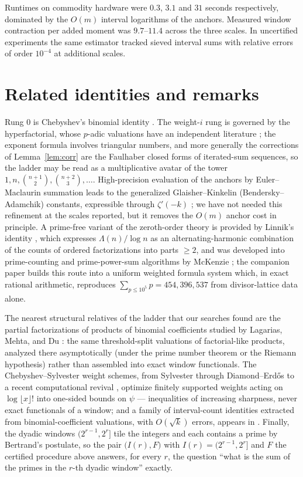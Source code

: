 \documentclass[11pt]{article}
\theoremstyle{remark}
\begin{document}
\noindent
Runtimes on commodity hardware were $0.3$, $3.1$ and $31$ seconds respectively, dominated by the
$O(m)$ interval logarithms of the anchors. Measured window contraction per added moment was $9.7$--$11.4$
across the three scales. In uncertified experiments the same estimator tracked sieved interval sums with
relative errors of order $10^{-4}$ at additional scales.

\section{Related identities and remarks}

Rung $0$ is Chebyshev's binomial identity \cite{Cheb}. The weight-$i$ rung is governed by the
hyperfactorial, whose $p$-adic valuations have an independent literature \cite{HypVal1,HypVal2}; the
exponent formula involves triangular numbers, and more generally the corrections of
Lemma~\ref{lem:corr} are the Faulhaber closed forms of iterated-sum sequences, so the ladder may be
read as a multiplicative avatar of the tower $1, n, \binom{n+1}{2}, \binom{n+2}{3}, \dots$. High-precision
evaluation of the anchors by Euler--Maclaurin summation leads to the generalized Glaisher--Kinkelin
(Bendersky--Adamchik) constants, expressible through $\zeta'(-k)$ \cite{Bend,Adam,Coppo}; we have not
needed this refinement at the scales reported, but it removes the $O(m)$ anchor cost in principle. A
prime-free variant of the zeroth-order theory is provided by Linnik's identity \cite{Linnik}, which
expresses $\Lambda(n)/\log n$ as an alternating-harmonic combination of the counts of ordered
factorizations into parts $\ge 2$, and was developed into prime-counting and prime-power-sum
algorithms by McKenzie \cite{McKenzie}; the companion paper \cite{Companion} builds this route into a
uniform weighted formula system which, in exact rational arithmetic, reproduces
$\sum_{p \le 10^5} p = 454{,}396{,}537$ from divisor-lattice data alone.

The nearest structural relatives of the ladder that our searches found are the partial factorizations
of products of binomial coefficients studied by Lagarias, Mehta, and Du \cite{LM,DuL}: the same
threshold-split valuations of factorial-like products, analyzed there asymptotically (under the prime
number theorem or the Riemann hypothesis) rather than assembled into exact window functionals. The
Chebyshev--Sylvester weight schemes, from Sylvester through Diamond--Erd\H{o}s \cite{DE} to a recent
computational revival \cite{Gantumur}, optimize finitely supported weights acting on
$\log \lfloor x \rfloor!$ into one-sided bounds on $\psi$ --- inequalities of increasing sharpness,
never exact functionals of a window; and a family of interval-count identities extracted from
binomial-coefficient valuations, with $O(\sqrt k)$ errors, appears in \cite{Xylouris}. Finally, the dyadic windows
$(2^{r-1}, 2^r]$ tile the integers and each contains a prime by Bertrand's postulate, so the pair
$\big(I(r), F\big)$ with $I(r) = (2^{r-1}, 2^r]$ and $F$ the certified procedure above answers, for
every $r$, the question ``what is the sum of the primes in the $r$-th dyadic window'' exactly.
\end{document}
